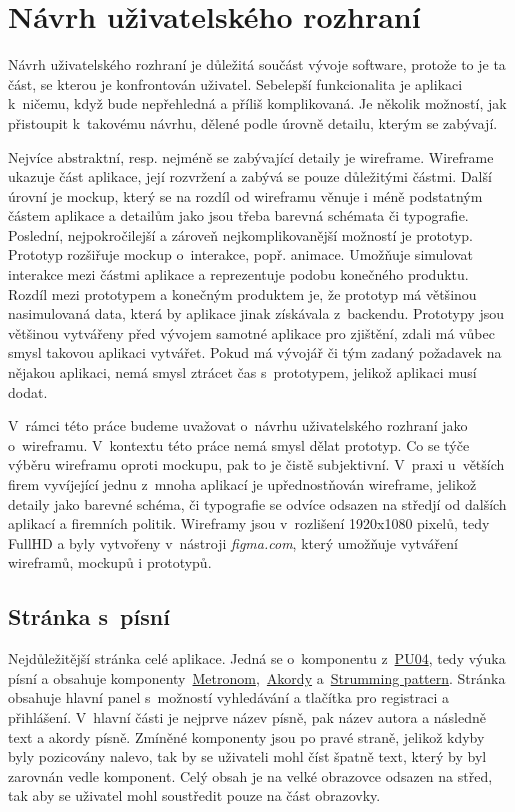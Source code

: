 \section{Návrh uživatelského rozhraní}
\label{sc:wireframes}
Návrh uživatelského rozhraní je důležitá součást vývoje software, protože to je ta část, se kterou je konfrontován uživatel. Sebelepší funkcionalita je aplikaci k~ničemu, když bude nepřehledná a příliš komplikovaná. Je několik možností, jak přistoupit k~takovému návrhu, dělené podle úrovně detailu, kterým se zabývají.

Nejvíce abstraktní, resp. nejméně se zabývající detaily je wireframe. Wireframe ukazuje část aplikace, její rozvržení a zabývá se pouze důležitými částmi. Další úrovní je mockup, který se na rozdíl od wireframu věnuje i méně podstatným částem aplikace a detailům jako jsou třeba barevná schémata či typografie. Poslední, nejpokročilejší a zároveň nejkomplikovanější možností je prototyp. Prototyp rozšiřuje mockup o~interakce, popř. animace. Umožňuje simulovat interakce mezi částmi aplikace a reprezentuje podobu konečného produktu. Rozdíl mezi prototypem a konečným produktem je, že prototyp má většinou nasimulovaná data, která by aplikace jinak získávala z~backendu. Prototypy jsou většinou vytvářeny před vývojem samotné aplikace pro zjištění, zdali má vůbec smysl takovou aplikaci vytvářet. Pokud má vývojář či tým zadaný požadavek na nějakou aplikaci, nemá smysl ztrácet čas s~prototypem, jelikož aplikaci musí dodat.

V~rámci této práce budeme uvažovat o~návrhu uživatelského rozhraní jako o~wireframu. V~kontextu této práce nemá smysl dělat prototyp. Co se týče výběru wireframu oproti mockupu, pak to je čistě subjektivní. V~praxi u~větších firem vyvíjející jednu z~mnoha aplikací je upřednostňován wireframe, jelikož detaily jako barevné schéma, či typografie se odvíce odsazen na středjí od dalších aplikací a firemních politik. Wireframy jsou v~rozlišení 1920x1080 pixelů, tedy FullHD a byly vytvořeny v~nástroji \emph{figma.com}, který umožňuje vytváření wireframů, mockupů i prototypů.

\subsection{Stránka s~písní}
\label{ss:wireframe_song}
Nejdůležitější stránka celé aplikace. Jedná se o~komponentu z~\hyperref[uc04]{PU04}, tedy výuka písní a obsahuje komponenty~\hyperref[uc1]{Metronom},~\hyperref[uc2]{Akordy} a~\hyperref[uc3]{Strumming pattern}. Stránka obsahuje hlavní panel s~možností vyhledávání a tlačítka pro registraci a přihlášení. V~hlavní části je nejprve název písně, pak název autora a následně text a akordy písně. Zmíněné komponenty jsou po pravé straně, jelikož kdyby byly pozicovány nalevo, tak by se uživateli mohl číst špatně text, který by byl zarovnán vedle komponent. Celý obsah je na velké obrazovce odsazen na střed, tak aby se uživatel mohl soustředit pouze na část obrazovky.

